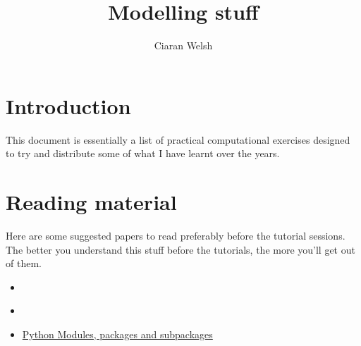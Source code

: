 \documentclass{article}
\title{Modelling stuff}
\author{Ciaran Welsh}
\begin{document}
    \maketitle
    \tableofcontents

    \section{Introduction}
    This document is essentially a list of practical computational exercises designed to try and distribute some of what
    I have learnt over the years.

    \section{Reading material}
    Here are some suggested papers to read preferably before the tutorial sessions. The better you understand this
    stuff before the tutorials, the more you'll get out of them.

    \begin{itemize}
        \item \cite{raue2013lessons}
        \item \cite{alon2007network}
        \item \href{https://www.tutorialspoint.com/python/python_modules.htm}{Python Modules, packages and subpackages}
    \end{itemize}

    
    

    
\end{document}
